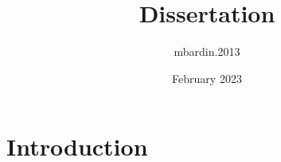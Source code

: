 \documentclass{article}
\title{Dissertation}
\author{mbardin.2013 }
\date{February 2023}
\begin{document}
\maketitle

\section{Introduction}
\end{document}
